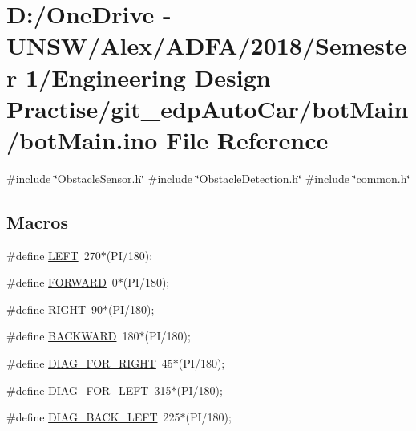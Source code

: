 \hypertarget{bot_main_8ino}{}\section{D\+:/\+One\+Drive -\/ U\+N\+S\+W/\+Alex/\+A\+D\+F\+A/2018/\+Semester 1/\+Engineering Design Practise/git\+\_\+edp\+Auto\+Car/bot\+Main/bot\+Main.ino File Reference}
\label{bot_main_8ino}
{\ttfamily \#include \char`\"{}Obstacle\+Sensor.\+h\char`\"{}}\newline
{\ttfamily \#include \char`\"{}Obstacle\+Detection.\+h\char`\"{}}\newline
{\ttfamily \#include \char`\"{}common.\+h\char`\"{}}\newline
\subsection*{Macros}
\begin{DoxyCompactItemize}
\item 
\#define \mbox{\hyperlink{bot_main_8ino_a437ef08681e7210d6678427030446a54}{L\+E\+FT}}~270$\ast$(PI/180);
\item 
\#define \mbox{\hyperlink{bot_main_8ino_a6ddfdda7a062d10cff4a72b76b44aeb8}{F\+O\+R\+W\+A\+RD}}~0$\ast$(PI/180);
\item 
\#define \mbox{\hyperlink{bot_main_8ino_a80fb826a684cf3f0d306b22aa100ddac}{R\+I\+G\+HT}}~90$\ast$(PI/180);
\item 
\#define \mbox{\hyperlink{bot_main_8ino_adf445abfe1b77fa63f89e315ccc2f7f2}{B\+A\+C\+K\+W\+A\+RD}}~180$\ast$(PI/180);
\item 
\#define \mbox{\hyperlink{bot_main_8ino_af0d4dc28dbd73c9eaadb8316bd959191}{D\+I\+A\+G\+\_\+\+F\+O\+R\+\_\+\+R\+I\+G\+HT}}~45$\ast$(PI/180);
\item 
\#define \mbox{\hyperlink{bot_main_8ino_a7cfa9cd93a3a325dcce552ff4372733a}{D\+I\+A\+G\+\_\+\+F\+O\+R\+\_\+\+L\+E\+FT}}~315$\ast$(PI/180);
\item 
\#define \mbox{\hyperlink{bot_main_8ino_ae4e94bd8dbc179e392c03bd987d6b05b}{D\+I\+A\+G\+\_\+\+B\+A\+C\+K\+\_\+\+L\+E\+FT}}~225$\ast$(PI/180);
\end{DoxyCompactItemize}
